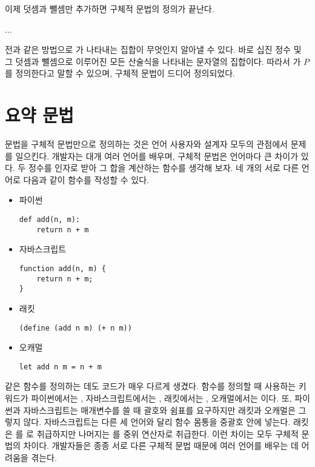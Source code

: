 이제 덧셈과 뺄셈만 추가하면 구체적 문법의 정의가 끝난다.

...

전과 같은 방법으로 가 나타내는 집합이 무엇인지 알아낼 수 있다. 바로
십진 정수 및 그 덧셈과 뺄셈으로 이루어진 모든 산술식을 나타내는 문자열의
집합이다. 따라서 가  $P$를 정의한다고 말할 수 있으며,
 구체적 문법이 드디어 정의되었다.

\section{요약 문법}

문법을 구체적 문법만으로 정의하는 것은 언어 사용자와 설계자 모두의 관점에서
문제를 일으킨다. 개발자는 대개 여러 언어를 배우며, 구체적 문법은 언어마다 큰
차이가 있다. 두 정수를 인자로 받아 그 합을 계산하는 함수를 생각해 보자. 네 개의
서로 다른 언어로 다음과 같이 함수를 작성할 수 있다.

\begin{itemize}
  \item 파이썬

\begin{verbatim}
def add(n, m):
    return n + m
\end{verbatim}

  \item 자바스크립트

\begin{verbatim}
function add(n, m) {
    return n + m;
}
\end{verbatim}

  \item 래킷

\begin{verbatim}
(define (add n m) (+ n m))
\end{verbatim}

  \item 오캐멀

\begin{verbatim}
let add n m = n + m
\end{verbatim}
\end{itemize}

같은 함수를 정의하는 데도 코드가 매우 다르게 생겼다. 함수를 정의할 때 사용하는
키워드가 파이썬에서는 , 자바스크립트에서는 , 래킷에서는
, 오캐멀에서는 이다. 또, 파이썬과 자바스크립트는
매개변수를 쓸 때 괄호와 쉼표를 요구하지만 래킷과 오캐멀은 그렇지 않다.
자바스크립트는 다른 세 언어와 달리 함수 몸통을 중괄호 안에 넣는다. 래킷은
\code{+}를 로 취급하지만 나머지는 \code{+}를
중위 연산자로 취급한다. 이런 차이는 모두 구체적 문법의 차이다. 개발자들은 종종
서로 다른 구체적 문법 때문에 여러 언어를 배우는 데 어려움을 겪는다.

